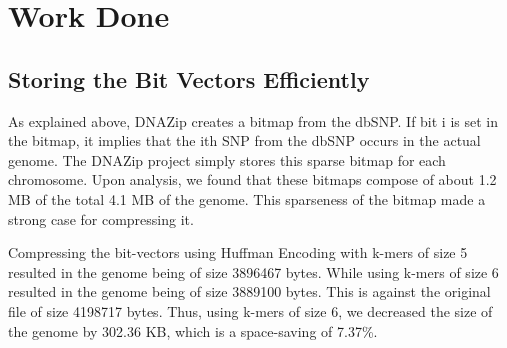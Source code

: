 \documentclass{article}
\begin{document}
\section {Work Done}

\subsection {Storing the Bit Vectors Efficiently}
As explained above, DNAZip creates a bitmap from the dbSNP. If bit i is set in the bitmap, it implies that the ith SNP from the dbSNP occurs in the actual genome. The DNAZip project simply stores this sparse bitmap for each chromosome. Upon analysis, we found that these bitmaps compose of about 1.2 MB of the total 4.1 MB of the genome. This sparseness of the bitmap made a strong case for compressing it.

Compressing the bit-vectors using Huffman Encoding with k-mers of size 5 resulted in the genome being of size 3896467 bytes. While using k-mers of size 6 resulted in the genome being of size 3889100 bytes. This is against the original file of size 4198717 bytes. Thus, using k-mers of size 6, we decreased the size of the genome by 302.36 KB, which is a space-saving of 7.37\%.\\
\end{document}

